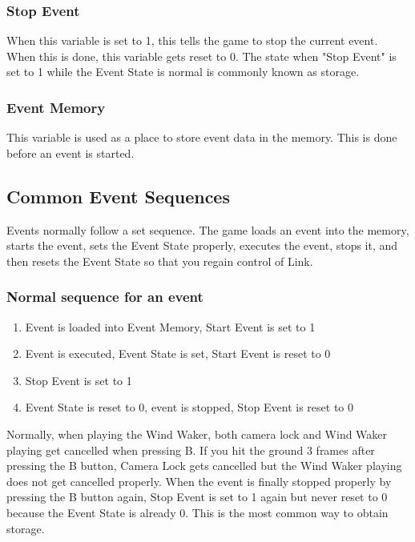 \documentclass[titlepage,12pt,a4paper]{article}
\begin{document}
\subsubsection{Stop Event}
When this variable is set to 1, this tells the game to stop the current event. When this is done, this variable gets reset to 0. The state when "Stop Event" is set to 1 while the Event State is normal is commonly known as storage.

\subsubsection{Event Memory}
This variable is used as a place to store event data in the memory. This is done before an event is started.

\subsection{Common Event Sequences}
Events normally follow a set sequence. The game loads an event into the memory, starts the event, sets the Event State properly, executes the event, stops it, and then resets the Event State so that you regain control of Link.

\subsubsection{Normal sequence for an event}
\begin{enumerate}
	\item Event is loaded into Event Memory, Start Event is set to 1
	\item Event is executed, Event State is set, Start Event is reset to 0
	\item Stop Event is set to 1
	\item Event State is reset to 0, event is stopped, Stop Event is reset to 0
\end{enumerate}

Normally, when playing the Wind Waker, both camera lock and Wind Waker playing get cancelled when pressing B. If you hit the ground 3 frames after pressing the B button, Camera Lock gets cancelled but the Wind Waker playing does not get cancelled properly. When the event is finally stopped properly by pressing the B button again, Stop Event is set to 1 again but never reset to 0 because the Event State is already 0. This is the most common way to obtain storage.
\end{document}

